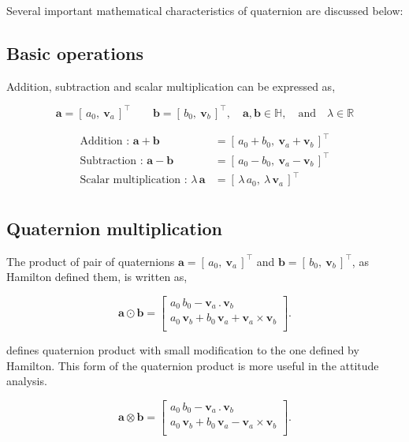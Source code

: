 \documentclass[12pt]{article}
\begin{document}
Several important mathematical characteristics of quaternion are discussed below:

\subsection{Basic operations}
Addition, subtraction and scalar multiplication can be expressed as,

$$\bm{a} = [\, a_{0} ,\: \bm{v}_{a} \,]^{\intercal} \quad \quad \bm{b} = [\, b_{0} ,\: \bm{v}_{b} \,]^{\intercal}, \quad \bm{a}, \bm{b} \in \mathbb{H}, \quad \text{and} \quad \lambda \in \mathbb{R} $$

\begin{equation}
    \begin{split}
    \text{Addition : } \bm{a} + \bm{b} &= [\, a_{0} + b_{0} ,\: \bm{v}_{a} + \bm{v}_{b} \,]^{\intercal} \\
    \text{Subtraction : }  \bm{a} - \bm{b} &= [\, a_{0} - b_{0} ,\: \bm{v}_{a} - \bm{v}_{b} \,]^{\intercal} \\
    \text{Scalar multiplication : }  \lambda \, \bm{a} &= [\, \lambda \, a_{0} ,\: \lambda \, \bm{v}_{a} \,]^{\intercal} \\
    \end{split}
\end{equation}

\subsection{Quaternion multiplication}
The product of pair of quaternions $\bm{a} = [\, a_{0} ,\: \bm{v}_{a}\,]^{\intercal}$ and $\bm{b} = [\, b_{0} ,\: \bm{v}_{b} \,]^{\intercal}$, as Hamilton defined them, is written as,

\begin{equation}
    \bm{a}\odot \bm{b} =
    \begin{bmatrix}
    a_{0} \, b_{0} -  \bm{v}_{a} \, . \, \bm{v}_{b} \\
    a_{0} \, \bm{v}_{b} + b_{0} \, \bm{v}_{a} + \bm{v}_{a} \times \bm{v}_{b} \\
    \end{bmatrix}.
    \label{eqn_hamilton_prod}
\end{equation}

\cite{markley2014} defines quaternion product with small modification to the one defined by Hamilton. This form of the quaternion product is more useful in the attitude analysis.

\begin{equation}
    \bm{a}\otimes\bm{b} =
    \begin{bmatrix}
        a_{0} \, b_{0} -  \bm{v}_{a} \, . \, \bm{v}_{b} \\
        a_{0} \, \bm{v}_{b} + b_{0} \, \bm{v}_{a} - \bm{v}_{a} \times \bm{v}_{b} \\
    \end{bmatrix}.
    \label{eqn_markley_notation}
\end{equation}
\end{document}
